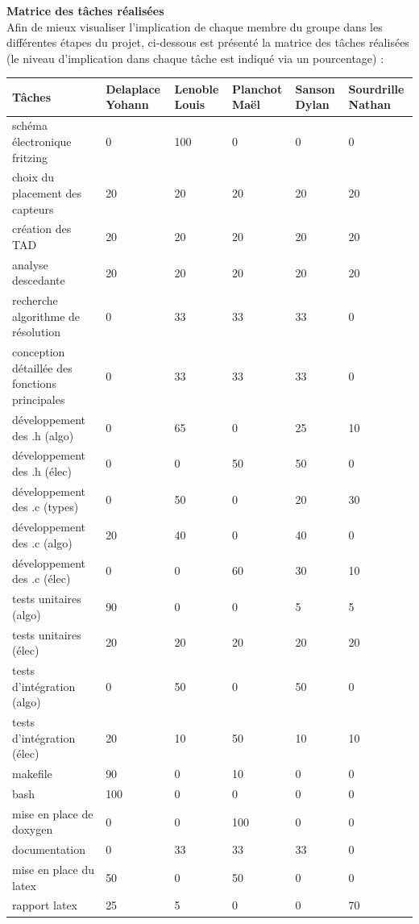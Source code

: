 \textbf{Matrice des tâches réalisées}\\
Afin de mieux visualiser l'implication de chaque membre du groupe dans les différentes étapes du projet, ci-dessous est présenté la matrice des tâches réalisées (le niveau d'implication dans chaque tâche est indiqué via un pourcentage) :
\begin{table}[ht]
\begin{adjustwidth}{-3cm}{-3cm}
\centering
\begin{tabular}{|p{2.2cm}|p{2.2cm}|p{2.2cm}|p{2.2cm}|p{2.2cm}|p{2.2cm}|}
\hline
\textbf{Tâches} & \textbf{Delaplace Yohann} & \textbf{Lenoble Louis} & \textbf{Planchot Maël} & \textbf{Sanson Dylan} & \textbf{Sourdrille Nathan} \\
\hline
schéma électronique fritzing & 0 & 100 & 0 & 0 & 0 \\
\hline
choix du placement des capteurs & 20 & 20 & 20 & 20 & 20 \\
\hline
création des TAD & 20 & 20 & 20 & 20 & 20 \\
\hline
analyse descedante & 20 & 20 & 20 & 20 & 20 \\
\hline
recherche algorithme de résolution & 0 & 33 & 33 & 33 & 0 \\
\hline
conception détaillée des fonctions principales & 0 & 33 & 33 & 33 & 0 \\
\hline
développement des .h (algo) & 0 & 65 & 0 & 25 & 10 \\
\hline
développement des .h (élec) & 0 & 0 & 50 & 50 & 0 \\
\hline
développement des .c (types) & 0 & 50 & 0 & 20 & 30 \\
\hline
développement des .c (algo) & 20 & 40 & 0 & 40 & 0 \\
\hline
développement des .c (élec) & 0 & 0 & 60 & 30 & 10 \\
\hline
tests unitaires (algo) & 90 & 0 & 0 & 5 & 5 \\
\hline
tests unitaires (élec) & 20 & 20 & 20 & 20 & 20 \\
\hline
tests d'intégration (algo) & 0 & 50 & 0 & 50 & 0 \\
\hline
tests d'intégration (élec) & 20 & 10 & 50 & 10 & 10 \\
\hline
makefile & 90 & 0 & 10 & 0 & 0 \\
\hline
bash & 100 & 0 & 0 & 0 & 0 \\
\hline
mise en place de doxygen & 0 & 0 & 100 & 0 & 0 \\
\hline
documentation & 0 & 33 & 33 & 33 & 0 \\
\hline
mise en place du latex & 50 & 0 & 50 & 0 & 0 \\
\hline
rapport latex & 25 & 5 & 0 & 0 & 70 \\
\hline

\end{tabular}
\end{adjustwidth}
\end{table}

